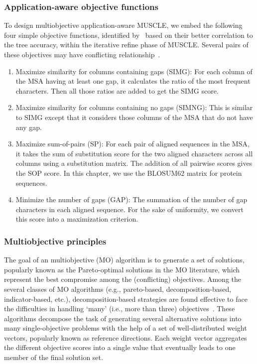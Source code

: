 \subsubsection{Application-aware objective functions}
To design multiobjective application-aware MUSCLE, we embed the following four simple objective functions, identified by~\cite{nayeem2020multiobjective} based on their better correlation to the tree accuracy, within the iterative refine phase of MUSCLE. Several pairs of these objectives may have conflicting relationship~\cite{nayeem2020multiobjective}.  
\begin{enumerate}
	\item Maximize similarity for columns containing gaps (SIMG): For each column of the MSA having at least one gap, it calculates the ratio of the most frequent characters. Then all those ratios are added to get the SIMG score.
	\item Maximize similarity for columns containing no gaps (SIMNG): This is similar to SIMG except that it considers those columns of the MSA that do not have any gap.
	\item Maximize sum-of-pairs (SP): For each pair of aligned sequences in the MSA, it takes the sum of substitution score for the two aligned characters across all columns using a substitution matrix. The addition of all pairwise scores gives the SOP score. In this chapter, we use the BLOSUM62 matrix for protein sequences.
	\item Minimize the number of gaps (GAP): The summation of the number of gap characters in each aligned sequence. For the sake of uniformity, we convert this score into a maximization criterion.
\end{enumerate}


\subsubsection{Multiobjective principles}
The goal of an multiobjective (MO) algorithm is to generate a set of solutions, popularly known as the Pareto-optimal solutions in the MO literature, which represent the best compromise among the (conflicting) objectives. 
Among the several classes of MO algorithms (e.g., pareto-based, decomposition-based, indicator-based, etc.), decomposition-based strategies are found effective to face the difficulties in handling `many' (i.e., more than three) objectives~\cite{li2015many}. These algorithms decompose the task of generating several alternative solutions into many single-objective problems with the help of a set of well-distributed weight vectors, popularly known as reference directions. Each weight vector aggregates the different objective scores into a single value that eventually leads to one member of the final solution set.

